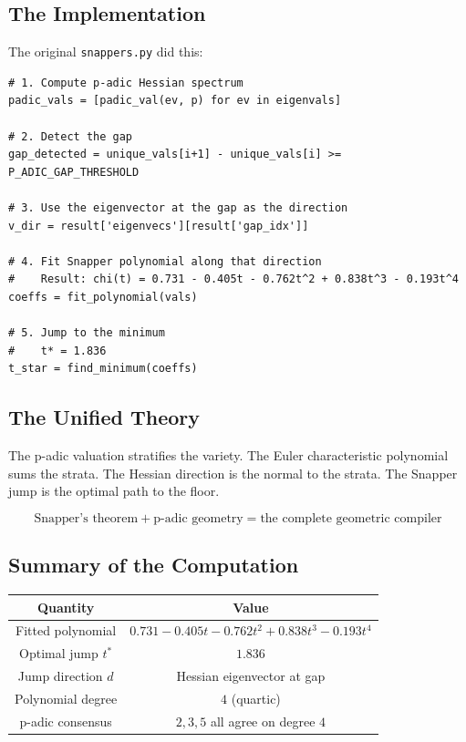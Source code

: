 \documentclass[11pt]{amsart}
\begin{document}
\subsection{The Implementation}

The original \texttt{snappers.py} did this:
\begin{verbatim}
# 1. Compute p-adic Hessian spectrum
padic_vals = [padic_val(ev, p) for ev in eigenvals]

# 2. Detect the gap
gap_detected = unique_vals[i+1] - unique_vals[i] >= P_ADIC_GAP_THRESHOLD

# 3. Use the eigenvector at the gap as the direction
v_dir = result['eigenvecs'][result['gap_idx']]

# 4. Fit Snapper polynomial along that direction
#    Result: chi(t) = 0.731 - 0.405t - 0.762t^2 + 0.838t^3 - 0.193t^4
coeffs = fit_polynomial(vals)

# 5. Jump to the minimum
#    t* = 1.836
t_star = find_minimum(coeffs)
\end{verbatim}

\subsection{The Unified Theory}

The p-adic valuation stratifies the variety. The Euler characteristic polynomial sums the strata. The Hessian direction is the normal to the strata. The Snapper jump is the optimal path to the floor.

\[
\boxed{\text{Snapper's theorem} + \text{p-adic geometry} = \text{the complete geometric compiler}}
\]

\subsection{Summary of the Computation}

\begin{center}
\begin{tabular}{c|c}
\textbf{Quantity} & \textbf{Value} \\
\hline
Fitted polynomial & $0.731 - 0.405t - 0.762t^2 + 0.838t^3 - 0.193t^4$ \\
Optimal jump $t^*$ & $1.836$ \\
Jump direction $d$ & Hessian eigenvector at gap \\
Polynomial degree & $4$ (quartic) \\
p-adic consensus & $2, 3, 5$ all agree on degree $4$
\end{tabular}
\end{center}
\end{document}
